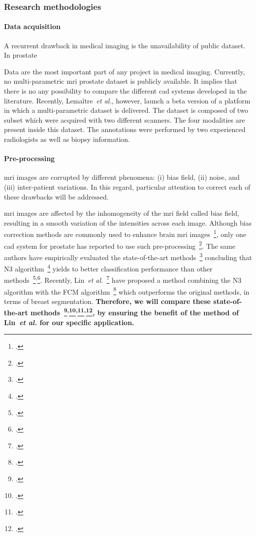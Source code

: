\subsubsection{Research methodologies}
\label{sec:methodologies}

\paragraph{Data acquisition}

A recurrent drawback in medical imaging is the unavailability of public dataset.
In prostate 

Data are the most important part of any project in medical imaging.
Currently, no multi-parametric \ac{mri} prostate dataset is publicly available.
It implies that there is no any possibility to compare the different \ac{cad} systems developed in the literature.
Recently, Lema\^itre~\emph{et al.}, however, launch a beta version of a platform in which a multi-parametric dataset is delivered.
The dataset is composed of two subset which were acquired with two different scanners.
The four modalities are present inside this dataset.
The annotations were performed by two experienced radiologists as well as biopsy information.

\paragraph{Pre-processing}

\Ac{mri} images are corrupted by different phenomena: (i) bias field, (ii) noise, and (iii) inter-patient variations.
In this regard, particular attention to correct each of these drawbacks will be addressed.

\Ac{mri} images are affected by the inhomogeneity of the \ac{mri} field called bias field, resulting in a smooth variation of the intensities across each image.
Although bias correction methods are commonly used to enhance brain \ac{mri} images~\footcite{Vovk2007}, only one \ac{cad} system for prostate has reported to use such pre-processing~\footcite{Viswanath2009}.
The same authors have empirically evaluated the state-of-the-art methods~\footcite{viswanath2011empirical} concluding that N3 algorithm~\footcite{Sled1998} yields to better classification performance than other methods~\footcite{Styner2000}\textsuperscript{,}\footcite{Cohen2000}.
Recently, Lin~\emph{et al.}~\footcite{Lin2011} have proposed a method combining the N3 algorithm with the FCM algorithm~\footcite{Ahmed2002} which outperforms the original methods, in terms of breast segmentation.
\textbf{Therefore, we will compare these state-of-the-art methods~\footcite{Sled1998}\textsuperscript{,}\footcite{Styner2000}\textsuperscript{,}\footcite{Cohen2000}\textsuperscript{,}\footcite{Lin2011}, by ensuring the benefit of the method of Lin~\emph{et al.} for our specific application.}

